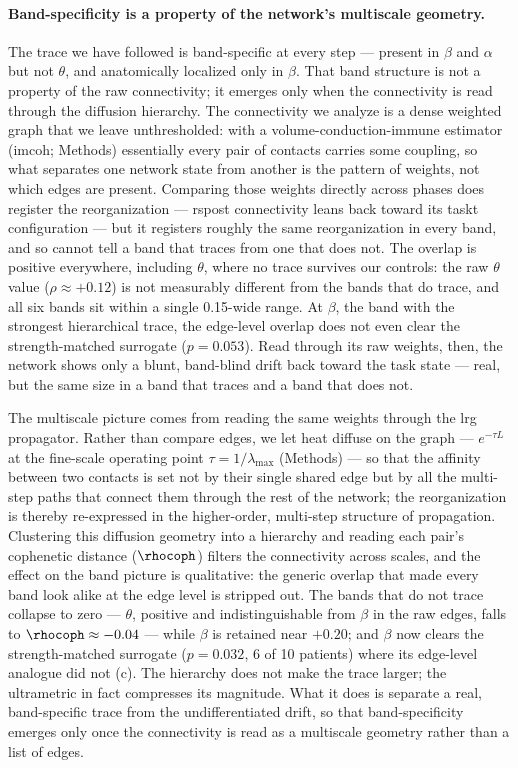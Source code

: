 \paragraph{Band-specificity is a property of the network's multiscale geometry.}
The trace we have followed is band-specific at every step --- present in \(\beta\) and \(\alpha\) but not \(\theta\), and anatomically localized only in \(\beta\). That band structure is not a property of the raw connectivity; it emerges only when the connectivity is read through the diffusion hierarchy. The connectivity we analyze is a dense weighted graph that we leave unthresholded: with a volume-conduction-immune estimator (\gls{imcoh}; Methods) essentially every pair of contacts carries some coupling, so what separates one network state from another is the pattern of weights, not which edges are present. Comparing those weights directly across phases does register the reorganization --- \acrshort{rspost} connectivity leans back toward its \acrshort{taskt} configuration --- but it registers roughly the same reorganization in every band, and so cannot tell a band that traces from one that does not. The overlap is positive everywhere, including \(\theta\), where no trace survives our controls: the raw \(\theta\) value (\(\rho \approx +0.12\)) is not measurably different from the bands that do trace, and all six bands sit within a single 0.15-wide range. At \(\beta\), the band with the strongest hierarchical trace, the edge-level overlap does not even clear the strength-matched surrogate (\(p = 0.053\)). Read through its raw weights, then, the network shows only a blunt, band-blind drift back toward the task state --- real, but the same size in a band that traces and a band that does not.

The multiscale picture comes from reading the same weights through the \gls{lrg} propagator. Rather than compare edges, we let heat diffuse on the graph --- \(e^{-\tau L}\) at the fine-scale operating point \(\tau = 1/\lambda_{\max}\) (Methods) --- so that the affinity between two contacts is set not by their single shared edge but by all the multi-step paths that connect them through the rest of the network; the reorganization is thereby re-expressed in the higher-order, multi-step structure of propagation. Clustering this diffusion geometry into a hierarchy and reading each pair's cophenetic distance (\(\rhocoph\)) filters the connectivity across scales, and the effect on the band picture is qualitative: the generic overlap that made every band look alike at the edge level is stripped out. The bands that do not trace collapse to zero --- \(\theta\), positive and indistinguishable from \(\beta\) in the raw edges, falls to \(\rhocoph \approx -0.04\) --- while \(\beta\) is retained near \(+0.20\); and \(\beta\) now clears the strength-matched surrogate (\(p = 0.032\), 6 of 10 patients) where its edge-level analogue did not (c). The hierarchy does not make the trace larger; the ultrametric in fact compresses its magnitude. What it does is separate a real, band-specific trace from the undifferentiated drift, so that band-specificity emerges only once the connectivity is read as a multiscale geometry rather than a list of edges.

